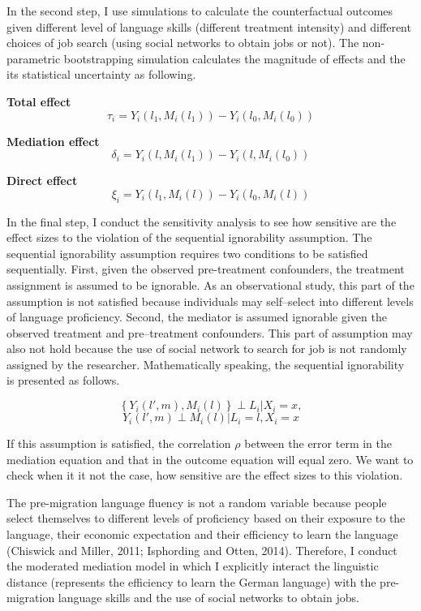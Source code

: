 \documentclass[12pt,a4paper]{article}
\begin{document}
In the second step, I use simulations to calculate the counterfactual outcomes given different level of language skills (different treatment intensity) and different choices of job search (using social networks to obtain jobs or not). The non-parametric bootstrapping simulation calculates the magnitude of effects and the its statistical uncertainty as following.

\textbf{Total effect}
$$\tau_{i} = Y_{i}(l_{1}, M_{i}(l_{1})) - Y_{i}(l_{0}, M_{i}(l_{0}))$$

\textbf{Mediation effect}
$$\delta_{i} = Y_{i}(l, M_{i}(l_{1})) - Y_{i}(l, M_{i}(l_{0}))$$

\textbf{Direct effect}
$$\xi_{i} = Y_{i}(l_{1}, M_{i}(l)) - Y_{i}(l_{0}, M_{i}(l))$$

In the final step, I conduct the sensitivity analysis to see how sensitive are the effect sizes to the violation of the sequential ignorability assumption. The sequential ignorability assumption requires two conditions to be satisfied sequentially. First, given the observed pre-treatment confounders, the treatment assignment is assumed to be ignorable. As an observational study, this part of the assumption is not satisfied because individuals may self--select into different levels of language proficiency. Second, the mediator is assumed ignorable given the observed treatment and pre--treatment confounders. This part of assumption may also not hold because the use of social network to search for job is not randomly assigned by the researcher. Mathematically speaking, the sequential ignorability is presented as follows.

$$\left \{Y_{i}(l', m), M_{i}(l)\right \} \perp L_{i}|X_{i}=x, $$
$$Y_{i}(l', m) \perp M_{i}(l)|L_{i}=l, X_{i}=x $$

If this assumption is satisfied, the correlation $\rho$ between the error term in the mediation equation and that in the outcome equation will equal zero. We want to check when it it not the case, how sensitive are the effect sizes to this violation.

The pre-migration language fluency is not a random variable because people select themselves to different levels of proficiency based on their exposure to the language, their economic expectation and their efficiency to learn the language (Chiswick and Miller, 2011; Isphording and Otten, 2014). Therefore, I conduct the moderated mediation model in which I explicitly interact the linguistic distance (represents the efficiency to learn the German language) with the pre-migration language skills and the use of social networks to obtain jobs. 
\end{document}
